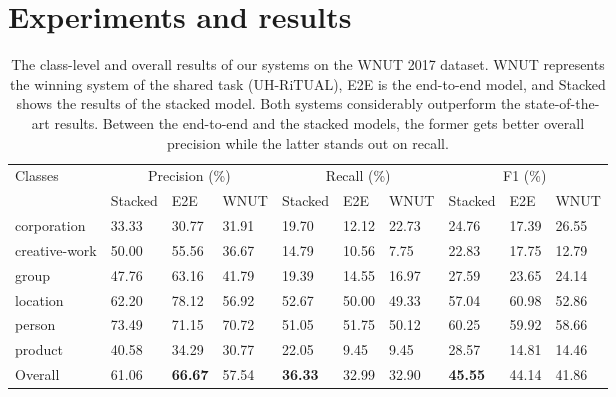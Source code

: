 \documentclass[11pt,a4paper]{article}
\begin{document}
\section{Experiments and results}
\label{sec:experiments}

\begin{table*}[t!]
\centering
\begin{tabular}{llllllllll}
\hline
\multirow{2}{*}{Classes} &
\multicolumn{3}{c}{Precision (\%)} &
\multicolumn{3}{c}{Recall (\%)} &
\multicolumn{3}{c}{F1 (\%)} \\
				& Stacked	& E2E    & WNUT   & Stacked  & E2E    & WNUT   & Stacked & E2E    & WNUT \\\hline
corporation 	& 33.33		& 30.77  & 31.91  & 19.70    & 12.12  & 22.73  & 24.76   & 17.39  & 26.55 \\
creative-work 	& 50.00		& 55.56  & 36.67  & 14.79    & 10.56  &  7.75  & 22.83   & 17.75  & 12.79\\ 
group 			& 47.76		& 63.16  & 41.79  & 19.39    & 14.55  & 16.97  & 27.59   & 23.65  & 24.14\\ 
location 		& 62.20		& 78.12  & 56.92  & 52.67    & 50.00  & 49.33  & 57.04   & 60.98  & 52.86\\ 
person 			& 73.49		& 71.15  & 70.72  & 51.05    & 51.75  & 50.12  & 60.25   & 59.92  & 58.66 \\
product 		& 40.58		& 34.29  & 30.77  & 22.05    &  9.45  &  9.45  & 28.57   & 14.81  & 14.46 \\\hline
Overall  		& 61.06		& \textbf{66.67}  & 57.54  &\textbf{36.33} 	 & 32.99  & 32.90  & \textbf{45.55}   & 44.14  & 41.86 \\
\hline
\end{tabular} 
\caption{The class-level and overall results of our systems on the WNUT 2017 dataset. WNUT represents the winning system of the shared task (UH-RiTUAL), E2E is the end-to-end model, and Stacked shows the results of the stacked model. Both systems considerably outperform the state-of-the-art results. Between the end-to-end and the stacked models, the former gets better overall precision while the latter stands out on recall.}
\label{t:results_classes}
\end{table*}
\end{document}
